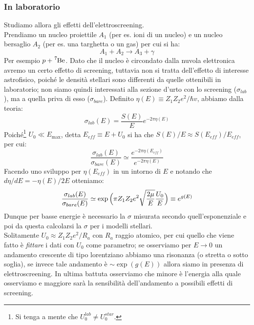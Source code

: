 \subsubsection{In laboratorio}
Studiamo allora gli effetti dell'elettroscreening.\\
Prendiamo un nucleo proiettile $A_1$ (per es. ioni di un nucleo) e un nucleo bersaglio $A_2$ (per es. una targhetta o un gas) per cui si ha:
$$A_1+A_2 \to A_3 + \gamma$$
Per esempio $p+\ce{^7Be}$. Dato che il nucleo è circondato dalla nuvola elettronica avremo un certo effetto di screening, tuttavia non si tratta dell'effetto di interesse astrofisico, poiché le densità stellari sono differenti da quelle ottenibili in laboratorio; non siamo quindi interessati alla sezione d'urto con lo screening ($\sigma_{lab}$), ma a quella priva di esso ($\sigma_{bare}$). Definito $\eta(E)\equiv Z_1Z_2e^2/\hbar v$, abbiamo dalla teoria:
$$\sigma_{lab}(E) = \frac{S(E)}{E}e^{-2\pi \eta(E)}$$
Poiché\footnote{Si tenga a mente che $U_0^{lab}\not= U_{0}^{star}$.} $U_0\ll E_{\max{}}$, detta $E_{eff}\equiv E+U_0$ si ha che $S(E)/E\approx S(E_{eff})/E_{eff}$, per cui:
$$\frac{\sigma_{lab}(E)}{\sigma_{bare}(E)} \simeq \frac{e^{-2\pi\eta(E_{eff})}}{e^{-2\pi\eta(E)}}$$
Facendo uno sviluppo per $\eta(E_{eff})$ in un intorno di $E$ e notando che $d\eta/dE = -\eta(E)/2E$ otteniamo:
$$\frac{\sigma_{lab}(E)}{\sigma_{bare}(E)} \simeq \exp{\Bigl ( \pi Z_1Z_2e^2 \sqrt{\frac{2\mu}{E}}\frac{U_0}{E} \Bigr )}\equiv e^{g(E)}$$
Dunque per basse energie è necessario  la $\sigma$ misurata secondo quell'esponenziale e poi da questa calcolarsi la $\sigma$ per i modelli stellari.\\
Solitamente $U_0\approx Z_1Z_2 e^2/R_a$ con $R_a$ raggio atomico, per cui quello che viene fatto è \textit{fittare} i dati con $U_0$ come parametro; se osserviamo per $E\to0$ un andamento crescente di tipo lorentziano abbiamo una risonanza (o stretta o sotto soglia), se invece tale andamento è $\sim \exp{(g(E))}$ allora siamo in presenza di elettroscreening. In ultima battuta osserviamo che minore è l'energia alla quale osserviamo e maggiore sarà la sensibilità dell'andamento a possibili effetti di screening.
